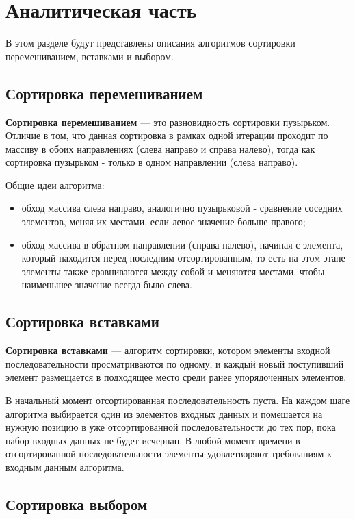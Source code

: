 \chapter{Аналитическая часть}
В этом разделе будут представлены описания алгоритмов сортировки перемешиванием, вставками и выбором.

\section{Сортировка перемешиванием}

\textbf{Сортировка перемешиванием \cite{sheyker}} — это разновидность сортировки пузырьком. Отличие в том, что данная сортировка в рамках одной итерации проходит по массиву в обоих направлениях (слева направо и справа налево), тогда как сортировка пузырьком - только в одном направлении (слева направо).

Общие идеи алгоритма:
\begin{itemize}
	\item обход массива слева направо, аналогично пузырьковой - сравнение соседних элементов, меняя их местами, если левое значение больше правого;
	\item обход массива в обратном направлении (справа налево), начиная с элемента, который находится перед последним отсортированным, то есть на этом этапе элементы также сравниваются между собой и меняются местами, чтобы наименьшее значение всегда было слева.
\end{itemize}


\section{Сортировка вставками}

\textbf{Сортировка вставками \cite{insert}} — алгоритм сортировки, котором элементы входной последовательности просматриваются по одному, и каждый новый поступивший элемент размещается в подходящее место среди ранее упорядоченных элементов.

В начальный момент отсортированная последовательность пуста. На
каждом шаге алгоритма выбирается один из элементов входных данных и помешается на нужную позицию в уже отсортированной последовательности до тех пор, пока набор входных данных не будет исчерпан. В любой момент времени в отсортированной последовательности элементы удовлетворяют требованиям к входным данным алгоритма.

\section{Сортировка выбором}

